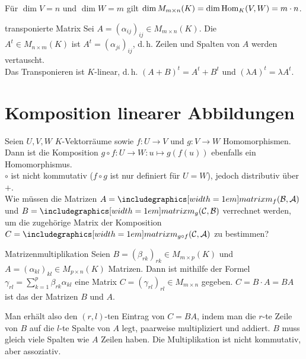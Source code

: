\begin{Kor}
    Für $\dim V = n$ und $\dim W = m$ gilt
    $\dim M_{m \times n}(K) = \dim \operatorname{Hom}_K(V, W) = m \cdot n$.
\end{Kor}

\begin{Def}{transponierte Matrix}
    Sei $A = (\alpha_{ij})_{ij} \in M_{m \times n}(K)$.
    Die  \\
    $A^t \in M_{n \times m}(K)$ ist
    $A^t = (\alpha_{ji})_{ij}$, d.\,h. Zeilen und Spalten von $A$ werden
    vertauscht. \\
    Das Transponieren ist $K$-linear, d.\,h. $(A + B)^t = A^t + B^t$ und
    $(\lambda A)^t = \lambda A^t$.
\end{Def}

\section{%
    Komposition linearer Abbildungen%
}

\begin{Bem}
    Seien $U, V, W$ $K$-Vektorräume sowie $f: U \rightarrow V$ und
    $g: V \rightarrow W$ Homomorphismen.
    Dann ist die Komposition $g \circ f: U \rightarrow W: u \mapsto g(f(u))$
    ebenfalls ein Homomorphismus. \\
    $\circ$ ist nicht kommutativ ($f \circ g$ ist nur definiert für $U = W$),
    jedoch distributiv über $+$. \\
    Wie müssen die Matrizen $A = \hommatrix{f}{B}{A}$ und
    $B = \hommatrix{g}{C}{B}$ verrechnet werden, um die zugehörige Matrix
    der Komposition $C = \hommatrix{g \circ f}{C}{A}$ zu bestimmen?
\end{Bem}

\begin{Def}{Matrizenmultiplikation}
    Seien $B = (\beta_{rk})_{rk} \in M_{m \times p}(K)$ und
    $A = (\alpha_{kl})_{kl} \in M_{p \times n}(K)$ Matrizen.
    Dann ist mithilfe der Formel
    $\gamma_{rl} = \sum_{k=1}^p \beta_{rk} \alpha_{kl}$ eine Matrix
    $C = (\gamma_{rl})_{rl} \in M_{m \times n}$ gegeben.
    $C = B \cdot A = BA$ ist das  der Matrizen $B$ und $A$.
\end{Def}

\begin{Bem}
    Man erhält also den $(r, l)$-ten Eintrag von $C = BA$, indem
    man die $r$-te Zeile von $B$ auf die $l$-te Spalte von $A$ legt,
    paarweise multipliziert und addiert.
    $B$ muss gleich viele Spalten wie $A$ Zeilen haben.
    Die Multiplikation ist nicht kommutativ, aber assoziativ.
\end{Bem}

